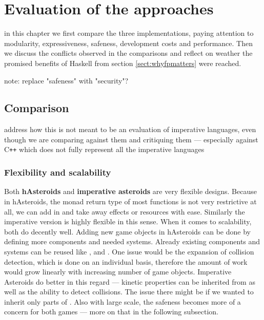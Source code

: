\documentclass[
  digital, %
  color,   %
  table,   %
  oneside, %
  lof,     %
  lot,     %
]{fithesis3}
\newcommand{\cpp}{C\nolinebreak\texttt{+}\nolinebreak\texttt{+}}
\begin{document}
{%

\chapter{Evaluation of the approaches}
\label{chptr:evaluation}

in this chapter we first compare the three implementations, paying attention to modularity,
expressiveness, safeness, development costs and performance.
Then we discuss the conflicts observed in the comparisons
and reflect on weather the promised benefits of Haskell from section \ref{sect:whyfpmatters}
were reached.

note: replace "safeness" with "security"?

\section{Comparison}

address how this is not meant to be an evaluation of imperative languages,
even though we are comparing against them and critiquing them
--- especially against \cpp{} which does not fully represent all the imperative languages

\subsection{Flexibility and scalability}

Both \textbf{hAsteroids} and \textbf{imperative asteroids} are very flexible designs.
Because in hAsteroids, the monad return type of most functions is not very
restrictive at all, we can add in and take away effects or resources with ease.
Similarly the imperative version is highly flexible in this sense. When it comes
to scalability, both do decently well. Adding new game objects in hAsteroids can be done by
defining more components and needed systems. Already existing components and systems can be reused
like ,  and .
One issue would be the expansion of collision detection,
which is done on an individual basis, therefore the amount of work
would grow linearly with increasing number of game objects.
Imperative Asteroids do better in this regard --- kinetic properties can
be inherited from  as well as the ability to detect collisions.
The issue there might be if we wanted to inherit only parts of .
Also with large scale, the safeness becomes more of a concern for both games
--- more on that in the following subsection.

}
\end{document}
